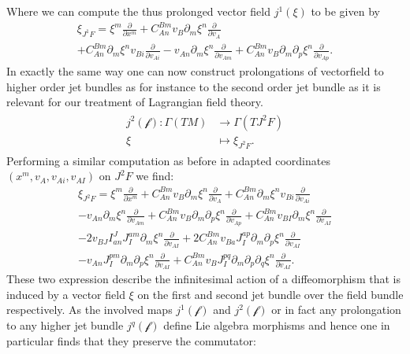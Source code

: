 \documentclass[a4paper,12pt, DIV=14, BCOR=5mm, twoside, headsepline]{scrbook}
\begin{document}
Where we can compute the thus prolonged vector field $j^1(\xi)$ to be given by 
\begin{multline}\label{LieJ1}
    \xi_{J^1F} = \xi^m \frac{\partial}{\partial x^m} + C_{An}^{Bm} v_B \partial_m \xi ^n \frac{\partial}{\partial v_A}\\
    + C_{An}^{Bm} \partial_m \xi^n v_{Bi} \frac{\partial}{\partial v_{Ai}} - v_{An} \partial_m \xi ^n \frac{\partial}{\partial v_{Am}} + C_{An}^{Bm} v_B \partial_m \partial_p \xi^n \frac{\partial}{\partial v_{Ap}}.
\end{multline}
In exactly the same way one can now construct prolongations of vectorfield to higher order jet bundles as for instance to the second order jet bundle as it is relevant for our treatment of Lagrangian field theory.
\begin{align}
    \begin{aligned}
    j^2(\mathcal{f}) : \Gamma(TM) &\longrightarrow \Gamma(TJ^2F)\\
    \xi & \longmapsto \xi_{J^2F}.
    \end{aligned}
\end{align}
Performing a similar computation as before in adapted coordinates $(x^m,v_A,v_{Ai}, v_{AI})$ on $J^2F$ we find:
\begin{multline}\label{LieJ2}
    \xi_{J^2F} = \xi^m \frac{\partial}{\partial x^m} + C_{An}^{Bm} v_B \partial_m \xi ^n \frac{\partial}{\partial v_A}
    + C_{An}^{Bm} \partial_m \xi^n v_{Bi} \frac{\partial}{\partial v_{Ai}}\\
    - v_{An} \partial_m \xi ^n \frac{\partial}{\partial v_{Am}} + C_{An}^{Bm} v_B \partial_m \partial_p \xi^n \frac{\partial}{\partial v_{Ap}} 
    + C_{An}^{Bm} v_{BI} \partial_m \xi ^n \frac{\partial}{\partial v_{AI}}\\
    - 2 v_{BJ} I^J_{an}J^{am}_I \partial_m \xi^n \frac{\partial}{\partial v_{AI}} + 2 C_{An}^{Bm} v_{Ba}J^{ap}_I \partial_m \partial_p \xi^n \frac{\partial}{\partial v_{AI}}\\
    - v_{An} J^{pm}_I \partial_m \partial_p \xi^n\frac{\partial}{\partial v_{AI}} + C_{An}^{Bm} v_B J^{pq}_I \partial_m \partial_p \partial_q \xi^n \frac{\partial}{\partial v_{AI}}.
\end{multline}
These two expression describe the infinitesimal action of a diffeomorphism that is induced by a vector field $\xi$ on the first and second jet bundle over the field bundle respectively. 
As the involved maps $j^1(\mathcal{f})$ and $j^2(\mathcal{f})$ or in fact any prolongation to any higher jet bundle $j^q(\mathcal{f})$ define Lie algebra morphisms and hence one in particular finds that they preserve the commutator:
\end{document}
